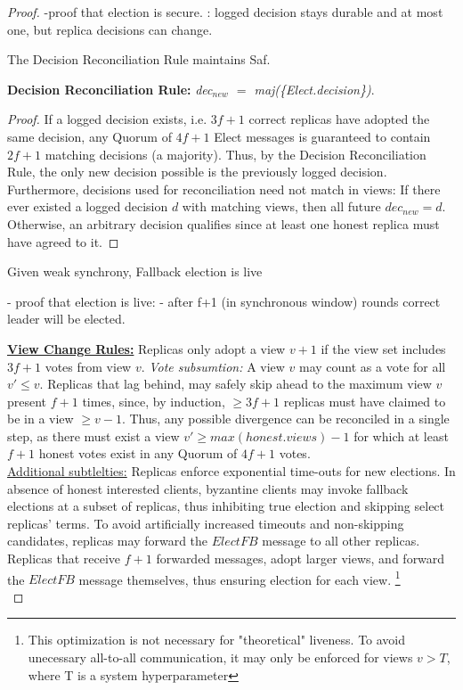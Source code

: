 {\begin{proof}
-proof that election is secure. : logged decision stays durable and at most one, but replica decisions can change.


\begin{lemma}
The Decision Reconciliation Rule maintains Saf.
\end{lemma}

\textbf{Decision Reconciliation Rule:} \textit{dec$_{new}$ $=$ maj(\{Elect.decision\})}. 

\begin{proof} If a logged decision exists, i.e. $3f+1$ correct replicas have adopted the same decision, any Quorum of $4f+1$ Elect messages is guaranteed to contain $2f+1$ matching decisions (a majority). Thus, by the Decision Reconciliation Rule, the only new decision possible is the previously logged decision. Furthermore, decisions used for reconciliation need not match in views: If there ever existed a logged decision $d$ with matching views, then all future $dec_{new} = d$.\\

 Otherwise, an arbitrary decision qualifies since at least one honest replica must have agreed to it.
\end{proof}
 


\begin{lemma}
Given weak synchrony, Fallback election is live 
\end{lemma}
- proof that election is live:
- after f+1 (in synchronous window) rounds correct leader will be elected.

\underline{\textbf{View Change Rules:}} \one Replicas only adopt a view $v+1$ if the view set includes $3f+1$ votes from view $v$. \textit{Vote subsumtion:} A view $v$ may count as a vote for all $v' \leq v$. \two Replicas that lag behind, may safely skip ahead to the maximum view $v$ present $f+1$ times, since, by induction, $\geq 3f+1$ replicas must have claimed to be in a view $\geq v-1$. Thus, any possible divergence can be reconciled in a single step, as there must exist a view $v' \geq max(honest.views) -1 $ for which at least $f+1$ honest votes exist in any Quorum of $4f+1$ votes.\\
\underline{Additional subtlelties:} Replicas enforce exponential time-outs for new elections. In absence of honest interested clients, byzantine clients may invoke fallback elections at a subset of replicas, thus inhibiting true election and skipping select replicas' terms. To avoid artificially increased timeouts and non-skipping candidates, replicas may forward the $ElectFB$ message to all other replicas. Replicas that receive $f+1$ forwarded messages, adopt larger views, and forward the $ElectFB$ message themselves, thus ensuring election for each view.
\footnote{This optimization is not necessary for "theoretical" liveness. To avoid unecessary all-to-all communication, it may only be enforced for views $v > T$, where T is a system hyperparameter }\\


\end{proof}}
